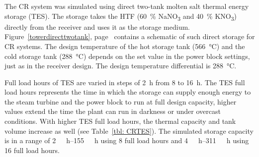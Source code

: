 The CR system was simulated using direct two-tank molten salt thermal energy storage (TES). The storage takes the HTF (\SI{60}{\percent} NaNO\textsubscript{3} and \SI{40}{\percent} KNO\textsubscript{3}) directly from the receiver and uses it as the storage medium. Figure~\ref{towerdirecttwotank}, page~\pageref{towerdirecttwotank} contains a schematic of such direct storage for CR systems. The design temperature of the hot storage tank (\SI{566}{\celsius}) and the cold storage tank (\SI{288}{\celsius}) depends on the set value in the power block settings, just as in the receiver design. The design temperature differential is \SI{288}{\celsius}.


Full load hours of TES are varied in steps of \SI{2}{h} from 8 to \SI{16}{h}. The TES full load hours represents the time in which the storage can supply enough energy to the steam turbine and the power block to run at full design capacity, higher values extend the time the plant can run in darkness or under overcast conditions. With higher TES full load hours, the thermal capacity and tank volume increase as well (see Table~\ref{tbl: CRTES}). The simulated storage capacity is in a range of \SIrange{2}{155}{\mega\wattth\hour} using 8 full load hours and \SIrange{4}{311}{\mega\wattth\hour} using 16 full load hours.

